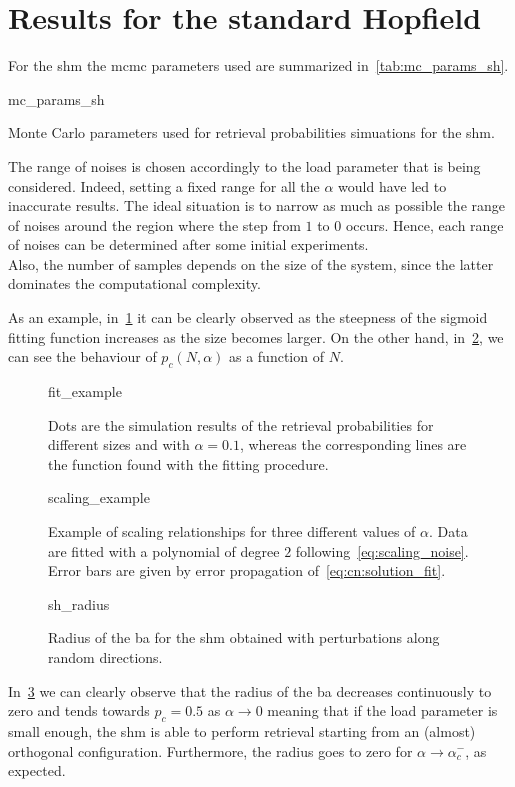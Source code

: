 \documentclass[\rootdir/main.tex]{subfiles}
\begin{document}
\section{Results for the standard Hopfield}
For the \acrlong{shm} the \acrlong{mcmc} parameters used are summarized in~\cref{tab:mc_params_sh}.\\
\begin{table}[hbt]
    \centering
    {mc_params_sh}
    \caption{Monte Carlo parameters used for retrieval probabilities simuations for the \acrlong{shm}.}
    \label{tab:mc_params_sh}
\end{table}
The range of noises is chosen accordingly to the load parameter that is being considered. Indeed, setting a fixed range for all the $\alpha$ would have led to inaccurate results. The ideal situation is to narrow as much as possible the range of noises around the region where the step from $1$ to $0$ occurs. Hence, each range of noises can be determined after some initial experiments.\\
Also, the number of samples depends on the size of the system, since the latter dominates the computational complexity. 

As an example, in~\cref{fig:sh_fit_example} it can be clearly observed as the steepness of the sigmoid fitting function increases as the size becomes larger. On the other hand, in~\cref{fig:sh:scaling_example}, we can see the behaviour of $p_c(N, \alpha)$ as a function of $N$.
\begin{figure}[hbt]
    \centering
    {fit_example}
    \caption{Dots are the simulation results of the retrieval probabilities for different sizes and with $\alpha = 0.1$, whereas the corresponding lines are the function found with the fitting procedure.}
    \label{fig:sh_fit_example}
\end{figure}
\begin{figure}
    \centering
    {scaling_example}
    \caption{Example of scaling relationships for three different values of $\alpha$. Data are fitted with a polynomial of degree $2$ following~\cref{eq:scaling_noise}. Error bars are given by error propagation of~\cref{eq:cn:solution_fit}.}
    \label{fig:sh:scaling_example}
\end{figure}
\begin{figure}
    \centering
    {sh_radius}
    \caption{Radius of the \acrlong{ba} for the \acrlong{shm} obtained with perturbations along random directions.}
    \label{fig:sh_radius}
\end{figure}
In~\cref{fig:sh_radius} we can clearly observe that the radius of the \acrlong{ba} decreases continuously to zero and tends towards $p_c = 0.5$ as $\alpha \to 0$ meaning that if the load parameter is small enough, the \acrlong{shm} is able to perform retrieval starting from an (almost) orthogonal configuration. Furthermore, the radius goes to zero for $\alpha \to \alpha_c^-$, as expected.
\end{document}
